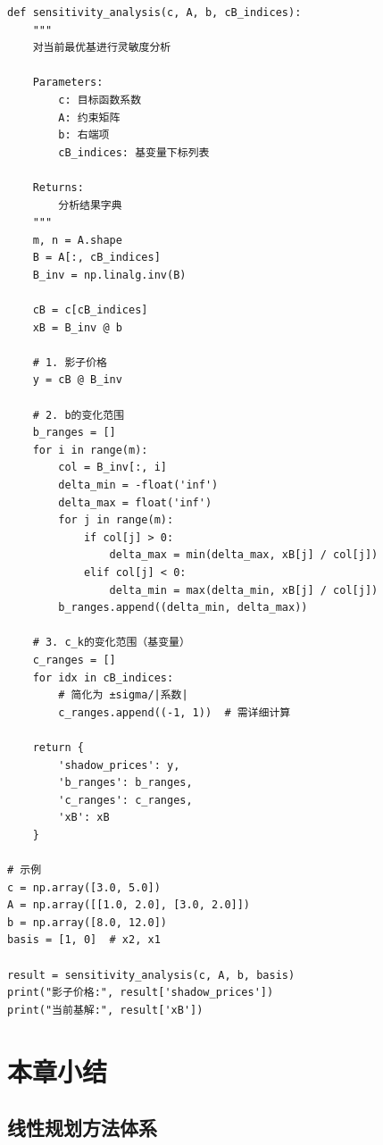 \begin{codebox}[灵敏度分析]
\begin{lstlisting}
def sensitivity_analysis(c, A, b, cB_indices):
    """
    对当前最优基进行灵敏度分析
    
    Parameters:
        c: 目标函数系数
        A: 约束矩阵
        b: 右端项
        cB_indices: 基变量下标列表
    
    Returns:
        分析结果字典
    """
    m, n = A.shape
    B = A[:, cB_indices]
    B_inv = np.linalg.inv(B)
    
    cB = c[cB_indices]
    xB = B_inv @ b
    
    # 1. 影子价格
    y = cB @ B_inv
    
    # 2. b的变化范围
    b_ranges = []
    for i in range(m):
        col = B_inv[:, i]
        delta_min = -float('inf')
        delta_max = float('inf')
        for j in range(m):
            if col[j] > 0:
                delta_max = min(delta_max, xB[j] / col[j])
            elif col[j] < 0:
                delta_min = max(delta_min, xB[j] / col[j])
        b_ranges.append((delta_min, delta_max))
    
    # 3. c_k的变化范围（基变量）
    c_ranges = []
    for idx in cB_indices:
        # 简化为 ±sigma/|系数|
        c_ranges.append((-1, 1))  # 需详细计算
    
    return {
        'shadow_prices': y,
        'b_ranges': b_ranges,
        'c_ranges': c_ranges,
        'xB': xB
    }

# 示例
c = np.array([3.0, 5.0])
A = np.array([[1.0, 2.0], [3.0, 2.0]])
b = np.array([8.0, 12.0])
basis = [1, 0]  # x2, x1

result = sensitivity_analysis(c, A, b, basis)
print("影子价格:", result['shadow_prices'])
print("当前基解:", result['xB'])
\end{lstlisting}
\end{codebox}

\section{本章小结}\label{sec:ch2-summary}

\subsection{线性规划方法体系}


